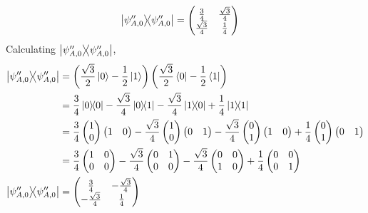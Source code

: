 \begin{align}
    \ketbra{\psi''_{A,0}} &= \begin{pmatrix}\frac{3}{4} & \frac{\sqrt{3}}{4} \\ \frac{\sqrt{3}}{4} & \frac{1}{4}\end{pmatrix}
\end{align}
Calculating $\ketbra{\psi''_{A,0}}$, 
\begin{align}
    \ketbra{\psi''_{A,0}} &= \left(\frac{\sqrt{3}}{2} \ket{0} - \frac{1}{2} \ket{1}\right)\left(\frac{\sqrt{3}}{2} \bra{0} - \frac{1}{2} \bra{1}\right) \\
    &= \frac{3}{4}\ketbra{0} - \frac{\sqrt{3}}{4}\ketbra{0}{1} - \frac{\sqrt{3}}{4}\ketbra{1}{0} + \frac{1}{4} \ketbra{1}{1} \\
    &= \frac{3}{4}\begin{pmatrix}1 \\ 0\end{pmatrix}\begin{pmatrix}1 & 0\end{pmatrix} - \frac{\sqrt{3}}{4}\begin{pmatrix}1 \\ 0\end{pmatrix}\begin{pmatrix}0 & 1\end{pmatrix} -  \frac{\sqrt{3}}{4}\begin{pmatrix}0 \\ 1\end{pmatrix}\begin{pmatrix}1 & 0\end{pmatrix}  + \frac{1}{4}\begin{pmatrix}0 \\ 1\end{pmatrix}\begin{pmatrix}0 & 1\end{pmatrix} \\
    &= \frac{3}{4}\begin{pmatrix}1 & 0 \\ 0 & 0\end{pmatrix} - \frac{\sqrt{3}}{4}\begin{pmatrix} 0 & 1 \\ 0 & 0\end{pmatrix} - \frac{\sqrt{3}}{4}\begin{pmatrix}0 & 0 \\ 1 & 0\end{pmatrix} + \frac{1}{4} \begin{pmatrix}0 & 0 \\ 0 & 1\end{pmatrix} \\
    \ketbra{\psi''_{A,0}} &= \begin{pmatrix}\frac{3}{4} & -\frac{\sqrt{3}}{4} \\ -\frac{\sqrt{3}}{4} & \frac{1}{4}\end{pmatrix}
\end{align}
